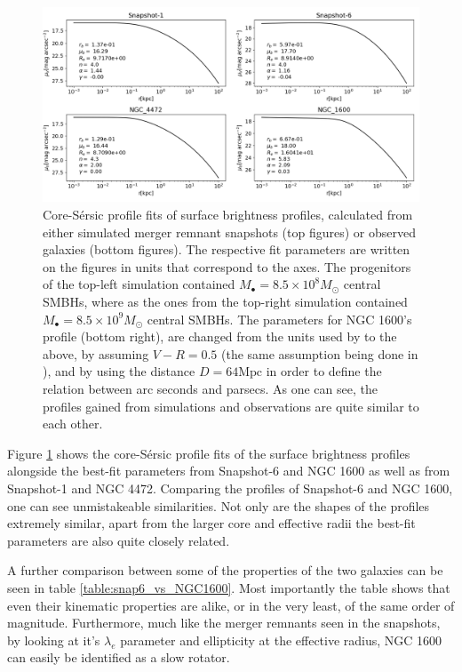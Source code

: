 \documentclass[english, oneside]{HYgradu}
\begin{document}
\begin{figure}[h]
	\centering
	\includegraphics[width=\textwidth]{core_sersic_fits_obs_and_sim.png}
	\caption{Core-Sérsic profile fits of surface brightness profiles, calculated from either simulated merger remnant snapshots (top figures) or observed galaxies (bottom figures). The respective fit parameters are written on the figures in units that correspond to the axes. The progenitors of the top-left simulation contained $M_\bullet = 8.5 \times 10^8 M_\odot$ central SMBHs, where as the ones from the top-right simulation contained $M_\bullet = 8.5 \times 10^9 M_\odot$ central SMBHs. The parameters for NGC 1600's profile (bottom right), are changed from the units used by \cite{Thomas2016} to the above, by assuming $V - R = 0.5$ (the same assumption being done in \cite{Lauer2007}), and by using the distance $D = 64 \mathrm{Mpc}$ \citep{Thomas2016} in order to define the relation between arc seconds and parsecs. As one can see, the profiles gained from simulations and observations are quite similar to each other.}
	\label{figure:coresersic_sim_obs}
\end{figure}

Figure \ref{figure:coresersic_sim_obs} shows the core-Sérsic profile fits of the surface brightness profiles alongside the best-fit parameters from Snapshot-6 and NGC 1600 as well as from Snapshot-1 and NGC 4472. Comparing the profiles of Snapshot-6 and NGC 1600, one can see unmistakeable similarities. Not only are the shapes of the profiles extremely similar, apart from the larger core and effective radii the best-fit parameters are also quite closely related.

A further comparison between some of the properties of the two galaxies can be seen in table \ref{table:snap6_vs_NGC1600}. Most importantly the table shows that even their kinematic properties are alike, or in the very least, of the same order of magnitude. Furthermore, much like the merger remnants seen in the snapshots, by looking at it's $\lambda_e$ parameter and ellipticity at the effective radius, NGC 1600 can easily be identified as a slow rotator.
\end{document}
